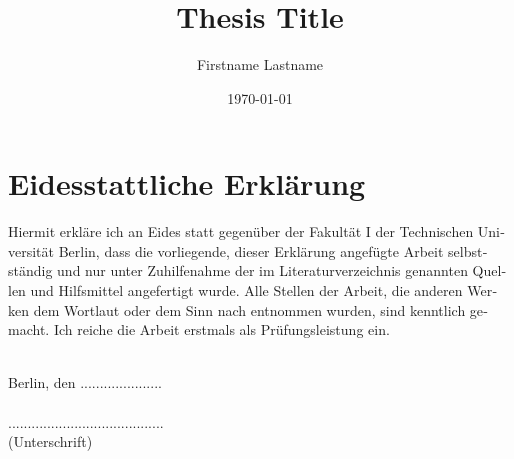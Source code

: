 \documentclass[12pt,oneside,a4paper]{scrreport}	%
\title{Thesis Title}
\author{Firstname Lastname}
\date{\today}
\begin{document}


\setcounter{secnumdepth}{\subsubsectionnumdepth}
\setcounter{tocdepth}{\subsubsectionnumdepth}




\section*{Eidesstattliche Erklärung}
\thispagestyle{empty}
\begin{otherlanguage}{ngerman}
Hiermit erkläre ich an Eides statt gegenüber der Fakultät I der Technischen Universität Berlin, dass die vorliegende, dieser Erklärung angefügte Arbeit selbstständig und nur unter Zuhilfenahme der im Literaturverzeichnis genannten Quellen und Hilfsmittel angefertigt wurde. Alle Stellen der Arbeit, die anderen Werken dem Wortlaut oder dem Sinn nach entnommen wurden, sind kenntlich gemacht. Ich reiche die Arbeit erstmals als Prüfungsleistung ein.\\
\end{otherlanguage}
\vspace*{2cm}\\
\noindent Berlin, den .....................\\
\vspace*{.5cm}\\
\noindent ........................................ \\
(Unterschrift)
\newpage


\newpage

\tableofcontents
\newpage










\appendix




\end{document}
